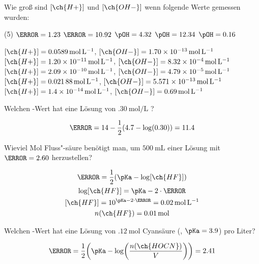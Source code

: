 \documentclass{arbeitsblatt}
\begin{document}
\begin{question}
  Wie groß sind \([\ch{H+}]\) und \([\ch{OH-}]\) wenn folgende Werte gemessen
  wurden:
  \begin{tasks}(5)
    \task \(\pH = \num{1.23}\)
    \task \(\pH = \num{10.92}\)
    \task \(\pOH = \num{4.32}\)
    \task \(\pOH = \num{12.34}\)
    \task \(\pOH = \num{0.16}\)
  \end{tasks}
\end{question}
\begin{solution}
  \begin{tasks}
    \task $[\ch{H+}] = \SI{0.0589}{\mole\per\liter}$, $[\ch{OH-}] =
      \SI{1.70e-13}{\mole\per\liter}$
    \task $[\ch{H+}] = \SI{1.20e-11}{\mole\per\liter}$, $[\ch{OH-}] =
      \SI{8.32e-4}{\mole\per\liter}$
    \task $[\ch{H+}] = \SI{2.09e-10}{\mole\per\liter}$, $[\ch{OH-}] =
      \SI{4.79e-5}{\mole\per\liter}$
    \task $[\ch{H+}] = \SI{0.02188}{\mole\per\liter}$, $[\ch{OH-}] =
      \SI{5.571e-13}{\mole\per\liter}$
    \task $[\ch{H+}] = \SI{1.4e-14}{\mole\per\liter}$, $[\ch{OH-}] =
      \SI{0.69}{\mole\per\liter}$
  \end{tasks}
\end{solution}

\begin{question}
  Welchen \pH-Wert hat eine Lösung von $\SI{.30}{\mole\per\liter}$ ?
\end{question}
\begin{solution}
  \[
    \pH = 14 - \frac{1}{2}(4.7 -\log(0.30)) = 11.4
  \]
\end{solution}

\begin{question}
  Wieviel Mol Fluss"-säure benötigt man, um $\SI{500}{\milli\liter}$ einer Lösung
  mit \(\pH=\num{2.60}\) herzustellen?
\end{question}
\begin{solution}
  \begin{gather*}
    \pH = \frac{1}{2}(\pKa -\log[\ch{HF}]) \\
    \log[\ch{HF}] = \pKa - 2\cdot\pH \\
    [\ch{HF}] = 10^{\pKa-2\cdot\pH} = \SI{0.02}{\mole\per\liter} \\
    n(\ch{HF}) = \SI{0.01}{\mole}
  \end{gather*}
\end{solution}

\begin{question}
  Welchen \pH-Wert hat eine Lösung von $\SI{.12}{\mole}$ Cyansäure (,
  \(\pKa=\num{3.9}\)) pro Liter?
\end{question}
\begin{solution}
  \[
    \pH = \frac{1}{2}\biggl(\pKa
          -\log\biggl(\frac{n(\ch{HOCN})}{V}\biggr)\biggr)
        = 2.41
  \]
\end{solution}
\end{document}
